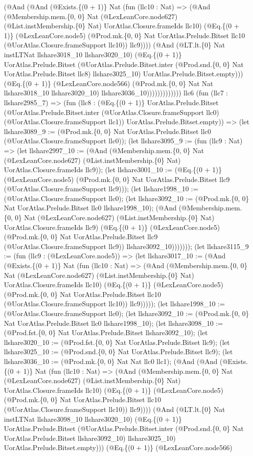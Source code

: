 \documentclass[11pt]{article}
\begin{document}
(@And (@And (@Exists.\{(0 + 1)\} Nat (fun (llc10 : Nat) => (@And (@Membership.mem.\{0, 0\} Nat (@LexLeanCore.node627) (@List.instMembership.\{0\} Nat) UorAtlas.Closure.frameIds llc10) (@Eq.\{(0 + 1)\} (@LexLeanCore.node5) (@Prod.mk.\{0, 0\} Nat UorAtlas.Prelude.Bitset llc10 (@UorAtlas.Closure.frameSupport llc10)) llc9)))) (@And (@LT.lt.\{0\} Nat instLTNat llshare3018\_10 llshare3020\_10) (@Eq.\{(0 + 1)\} UorAtlas.Prelude.Bitset (@UorAtlas.Prelude.Bitset.inter (@Prod.snd.\{0, 0\} Nat UorAtlas.Prelude.Bitset llc8) llshare3025\_10) UorAtlas.Prelude.Bitset.empty))) (@Eq.\{(0 + 1)\} (@LexLeanCore.node566) (@Prod.mk.\{0, 0\} Nat Nat llshare3018\_10 llshare3020\_10) llshare3036\_10))))))))))))) llc6 (fun (llc7 : llshare2985\_7) => (fun (llc8 : (@Eq.\{(0 + 1)\} UorAtlas.Prelude.Bitset (@UorAtlas.Prelude.Bitset.inter (@UorAtlas.Closure.frameSupport llc0) (@UorAtlas.Closure.frameSupport llc1)) UorAtlas.Prelude.Bitset.empty)) => (let llshare3089\_9 := (@Prod.mk.\{0, 0\} Nat UorAtlas.Prelude.Bitset llc0 (@UorAtlas.Closure.frameSupport llc0)); (let llshare3095\_9 := (fun (llc9 : Nat) => (let llshare2997\_10 := (@And (@Membership.mem.\{0, 0\} Nat (@LexLeanCore.node627) (@List.instMembership.\{0\} Nat) UorAtlas.Closure.frameIds llc9)); (let llshare3001\_10 := (@Eq.\{(0 + 1)\} (@LexLeanCore.node5) (@Prod.mk.\{0, 0\} Nat UorAtlas.Prelude.Bitset llc9 (@UorAtlas.Closure.frameSupport llc9))); (let llshare1998\_10 := (@UorAtlas.Closure.frameSupport llc0); (let llshare3092\_10 := (@Prod.mk.\{0, 0\} Nat UorAtlas.Prelude.Bitset llc0 llshare1998\_10); (@And (@Membership.mem.\{0, 0\} Nat (@LexLeanCore.node627) (@List.instMembership.\{0\} Nat) UorAtlas.Closure.frameIds llc9) (@Eq.\{(0 + 1)\} (@LexLeanCore.node5) (@Prod.mk.\{0, 0\} Nat UorAtlas.Prelude.Bitset llc9 (@UorAtlas.Closure.frameSupport llc9)) llshare3092\_10))))))); (let llshare3115\_9 := (fun (llc9 : (@LexLeanCore.node5)) => (let llshare3017\_10 := (@And (@Exists.\{(0 + 1)\} Nat (fun (llc10 : Nat) => (@And (@Membership.mem.\{0, 0\} Nat (@LexLeanCore.node627) (@List.instMembership.\{0\} Nat) UorAtlas.Closure.frameIds llc10) (@Eq.\{(0 + 1)\} (@LexLeanCore.node5) (@Prod.mk.\{0, 0\} Nat UorAtlas.Prelude.Bitset llc10 (@UorAtlas.Closure.frameSupport llc10)) llc9))))); (let llshare1998\_10 := (@UorAtlas.Closure.frameSupport llc0); (let llshare3092\_10 := (@Prod.mk.\{0, 0\} Nat UorAtlas.Prelude.Bitset llc0 llshare1998\_10); (let llshare3098\_10 := (@Prod.fst.\{0, 0\} Nat UorAtlas.Prelude.Bitset llshare3092\_10); (let llshare3020\_10 := (@Prod.fst.\{0, 0\} Nat UorAtlas.Prelude.Bitset llc9); (let llshare3025\_10 := (@Prod.snd.\{0, 0\} Nat UorAtlas.Prelude.Bitset llc9); (let llshare3036\_10 := (@Prod.mk.\{0, 0\} Nat Nat llc0 llc1); (@And (@And (@Exists.\{(0 + 1)\} Nat (fun (llc10 : Nat) => (@And (@Membership.mem.\{0, 0\} Nat (@LexLeanCore.node627) (@List.instMembership.\{0\} Nat) UorAtlas.Closure.frameIds llc10) (@Eq.\{(0 + 1)\} (@LexLeanCore.node5) (@Prod.mk.\{0, 0\} Nat UorAtlas.Prelude.Bitset llc10 (@UorAtlas.Closure.frameSupport llc10)) llc9)))) (@And (@LT.lt.\{0\} Nat instLTNat llshare3098\_10 llshare3020\_10) (@Eq.\{(0 + 1)\} UorAtlas.Prelude.Bitset (@UorAtlas.Prelude.Bitset.inter (@Prod.snd.\{0, 0\} Nat UorAtlas.Prelude.Bitset llshare3092\_10) llshare3025\_10) UorAtlas.Prelude.Bitset.empty))) (@Eq.\{(0 + 1)\} (@LexLeanCore.node566) 
\end{document}
